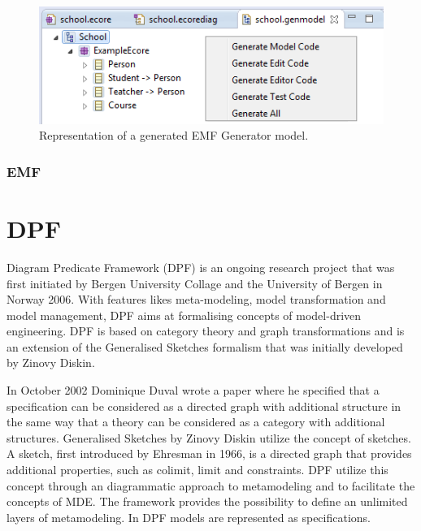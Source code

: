 \begin{figure}[H]
	\centering
	\includegraphics[scale=0.7]{./Figures/EMF_GenModel.png}
	\caption[Representation of an EMF Generator model]
	{Representation of a generated EMF Generator model.}
	\label{fig:EMF_Ecore}
\end{figure}

\subsubsection{EMF}

\section{DPF}

Diagram Predicate Framework\cite{Rutle_thesis,Rossini_thesis,Lamo2013} (DPF) is
an ongoing research project that was first initiated by Bergen University
Collage and the University of Bergen in Norway 2006. With features likes
meta-modeling, model transformation and model management, DPF aims at
formalising concepts of model-driven engineering. DPF is based on category
theory and graph transformations and is an extension of the Generalised
Sketches\cite{Diskin2003} formalism that was initially developed by Zinovy
Diskin.

In October 2002 Dominique Duval wrote a paper where he specified that a
specification can be considered as a directed graph with additional structure
in the same way that a theory can be considered as a category with additional
structures\cite{Duval2003}. Generalised Sketches by Zinovy Diskin utilize the
concept of sketches. A sketch, first introduced by Ehresman in 1966, is a
directed graph that provides additional properties, such as colimit, limit and
constraints. DPF utilize this concept through an diagrammatic approach to
metamodeling and to facilitate the concepts of MDE. The framework provides the
possibility to define an unlimited layers of metamodeling. In DPF models are
represented as specifications. 

